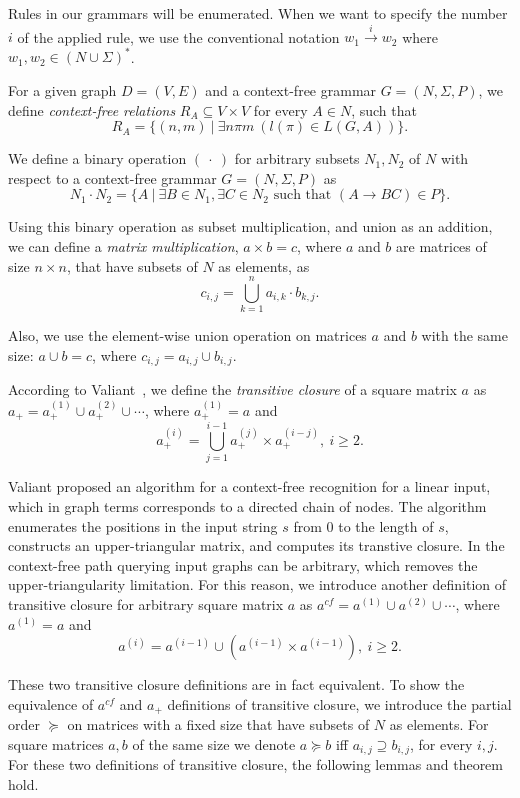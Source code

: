 Rules in our grammars will be enumerated. When we want to specify the number $i$ of the applied rule, we use the conventional notation \mbox{$w_1 \xrightarrow{i} w_2$} where \mbox{$w_1,w_2 \in (N \cup \Sigma)^*$}.

For a given graph \mbox{$D = (V, E)$} and a context-free grammar $G = (N, \Sigma, P)$, we define \emph{context-free relations} \mbox{$R_A \subseteq V \times V$} for every \mbox{$A \in N$}, such that $$R_A = \{(n,m)~|~\exists n \pi m~(l(\pi) \in L(G,A))\}.$$

We define a binary operation $(~\cdot~)$ for arbitrary subsets \mbox{$N_1, N_2$} of $N$ with respect to a context-free grammar \mbox{$G = (N, \Sigma, P)$} as $$N_1 \cdot N_2 = \{A~|~\exists B \in N_1, \exists C \in N_2 \text{ such that }(A \rightarrow B C) \in P\}.$$

Using this binary operation as subset multiplication, and union as an addition, we can define a \emph{matrix multiplication}, \mbox{$a \times b = c$}, where $a$ and $b$ are matrices of size $n\times n$, that have subsets of $N$ as elements, as $$c_{i,j} = \bigcup^{n}_{k=1}{a_{i,k} \cdot b_{k,j}}.$$

Also, we use the element-wise union operation on matrices $a$ and $b$ with the same size: \mbox{$a \cup b = c$}, where $c_{i,j} = a_{i,j} \cup b_{i,j}.$

According to Valiant~\cite{valiant}, we define the \emph{transitive closure} of a square matrix $a$ as \mbox{$a_+ = a^{(1)}_+ \cup a^{(2)}_+ \cup \cdots$}, where \mbox{$a^{(1)}_+ = a$} and $$a^{(i)}_+ = \bigcup^{i-1}_{j=1}{a^{(j)}_+ \times a^{(i-j)}_+}, ~i \ge 2.$$

Valiant proposed an algorithm for a context-free recognition for a linear input, which in graph terms corresponds to a directed chain of nodes. The algorithm enumerates the positions in the input string $s$ from 0 to the length of $s$, constructs an upper-triangular matrix, and computes its transtive closure. In the context-free path querying input graphs can be arbitrary, which removes the upper-triangularity  limitation. For this reason, we introduce another definition of transitive closure for arbitrary square matrix $a$ as \mbox{$a^{cf} = a^{(1)} \cup a^{(2)} \cup \cdots$}, where \mbox{$a^{(1)} = a$} and $$a^{(i)} = a^{(i-1)} \cup (a^{(i-1)} \times a^{(i-1)}), ~i \ge 2.$$

These two transitive closure definitions are in fact equivalent. To show the equivalence of $a^{cf}$ and $a_+$ definitions of transitive closure, we introduce the partial order $\succeq$ on matrices with a fixed size that have subsets of $N$ as elements. For square matrices $a, b$ of the same size we denote $a \succeq b$ iff $a_{i,j} \supseteq b_{i,j}$, for every $i, j$. For these two definitions of transitive closure, the following lemmas and theorem hold.

